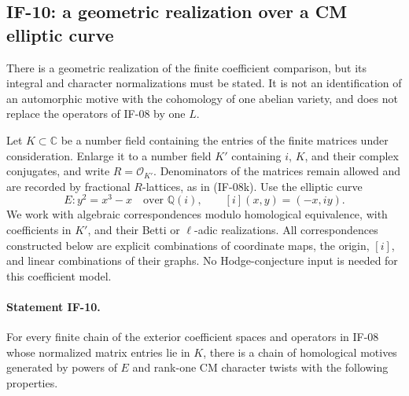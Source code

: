 \subsection{IF-10: a geometric realization over a CM elliptic curve}
There is a geometric realization of the finite coefficient comparison,
but its integral and character normalizations must be stated. It is not
an identification of an automorphic motive with the cohomology of one
abelian variety, and does not replace the operators of IF-08 by one $L$.

Let $K\subset\mathbb C$ be a number field containing the entries of the
finite matrices under consideration. Enlarge it to a number field
$K'$ containing $i$, $K$, and their complex conjugates, and write
$R=\mathcal O_{K'}$. Denominators of the matrices remain allowed and are
recorded by fractional $R$-lattices, as in (IF-08k). Use the elliptic curve
\[
 E:y^2=x^3-x\quad\text{over }\mathbb Q(i),\qquad
 [i](x,y)=(-x,iy).
\]
We work with algebraic correspondences modulo homological equivalence,
with coefficients in $K'$, and their Betti or $\ell$-adic realizations.
All correspondences constructed below are explicit combinations of
coordinate maps, the origin, $[i]$, and linear combinations of their
graphs. No Hodge-conjecture input is needed for this coefficient model.

\paragraph{Statement IF-10.}
For every finite chain of the exterior coefficient spaces and operators
in IF-08 whose normalized matrix entries lie in $K$, there is a chain
of homological motives generated by powers of $E$ and rank-one CM
character twists with the following properties.

